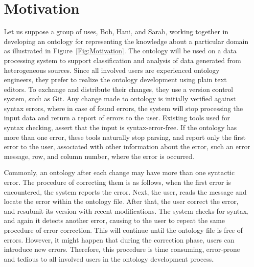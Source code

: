 
\section{Motivation}

Let us suppose a group of uses, Bob, Hani, and Sarah, working together in developing an ontology for representing the knowledge about a particular domain as illustrated in Figure~\ref{Fig:Motivation}.
The ontology will be used on a data processing system to support classification and analysis of data generated from heterogeneous sources. 
Since all involved users are experienced ontology engineers, they prefer to realize the ontology development using plain text editors.
To exchange and distribute their changes, they use a version control system, such as Git.
Any change made to ontology is initially verified against syntax errors, where in case of found errors, the system will stop processing the input data and return a report of errors to the user. 
Existing tools used for syntax checking, assert that the input is syntax-error-free. 
If the ontology has more than one error, these tools naturally stop parsing, and report only the first error to the user, associated with other information about the error, such an error message, row, and column number, where the error is occurred.

Commonly, an ontology after each change may have more than one syntactic error.
The procedure of correcting them is as follows, when the first error is encountered, the system reports the error.
Next, the user, reads the message and locate the error within the ontology file. 
After that, the user correct the error, and resubmit its version with recent modifications.
The system checks for syntax, and again it detects another error, causing to the user to repeat the same procedure of error correction.
This will continue until the ontology file is free of errors.
However, it might happen that during the correction phase, users can introduce new errors.
Therefore, this procedure is time consuming, error-prone and tedious to all involved users in the ontology development process.

